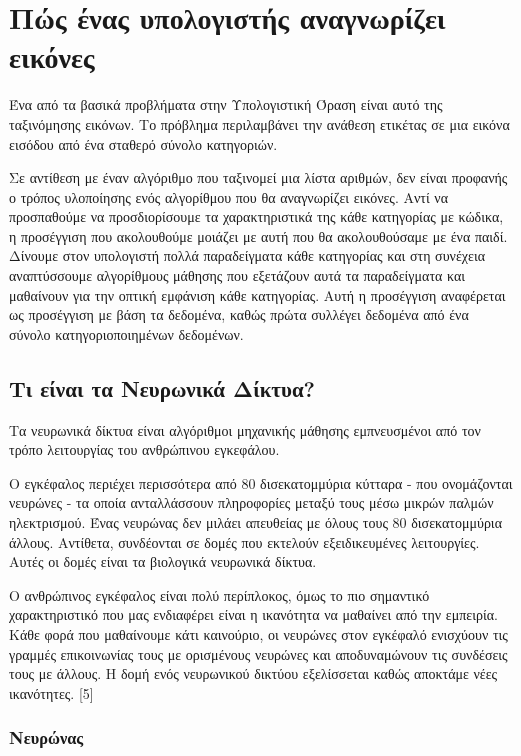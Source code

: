 \section{Πώς ένας υπολογιστής αναγνωρίζει εικόνες}

Ένα από τα βασικά προβλήματα στην Υπολογιστική Όραση είναι αυτό της ταξινόμησης εικόνων. Το πρόβλημα περιλαμβάνει την ανάθεση ετικέτας σε μια εικόνα εισόδου από ένα σταθερό σύνολο κατηγοριών.

Σε αντίθεση με έναν αλγόριθμο που ταξινομεί μια λίστα αριθμών, δεν είναι προφανής ο τρόπος υλοποίησης ενός αλγορίθμου που θα αναγνωρίζει εικόνες. Αντί να προσπαθούμε να προσδιορίσουμε τα χαρακτηριστικά της κάθε κατηγορίας με κώδικα, η προσέγγιση που ακολουθούμε μοιάζει με αυτή που θα ακολουθούσαμε με ένα παιδί. Δίνουμε στον υπολογιστή πολλά παραδείγματα κάθε κατηγορίας και στη συνέχεια αναπτύσσουμε αλγορίθμους μάθησης που εξετάζουν αυτά τα παραδείγματα και μαθαίνουν για την οπτική εμφάνιση κάθε κατηγορίας. Αυτή η προσέγγιση αναφέρεται ως προσέγγιση με βάση τα δεδομένα, καθώς πρώτα συλλέγει δεδομένα από ένα σύνολο κατηγοριοποιημένων δεδομένων.

\subsection{Τι είναι τα Νευρωνικά Δίκτυα?}
Τα νευρωνικά δίκτυα είναι αλγόριθμοι μηχανικής μάθησης εμπνευσμένοι από τον τρόπο λειτουργίας του ανθρώπινου εγκεφάλου. 

Ο εγκέφαλος περιέχει περισσότερα από 80 δισεκατομμύρια κύτταρα - που ονομάζονται νευρώνες - τα οποία ανταλλάσσουν πληροφορίες μεταξύ τους μέσω μικρών παλμών ηλεκτρισμού. Ένας νευρώνας δεν μιλάει απευθείας με όλους τους 80 δισεκατομμύρια άλλους. Αντίθετα, συνδέονται σε δομές που εκτελούν εξειδικευμένες λειτουργίες. Αυτές οι δομές είναι τα βιολογικά νευρωνικά δίκτυα.

Ο ανθρώπινος εγκέφαλος είναι πολύ περίπλοκος, όμως το πιο σημαντικό χαρακτηριστικό που μας ενδιαφέρει είναι η ικανότητα να μαθαίνει από την εμπειρία. Κάθε φορά που μαθαίνουμε κάτι καινούριο, οι νευρώνες στον εγκέφαλό ενισχύουν τις γραμμές επικοινωνίας τους με ορισμένους νευρώνες και αποδυναμώνουν τις συνδέσεις τους με άλλους. Η δομή ενός νευρωνικού δικτύου εξελίσσεται καθώς αποκτάμε νέες ικανότητες. [5]

\subsubsection{Νευρώνας}

